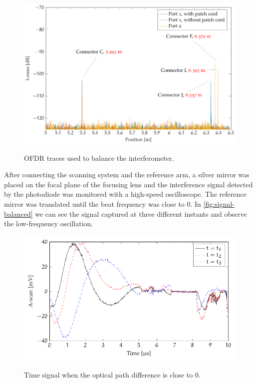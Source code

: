 \begin{figure}[hbt]
	\myfloatalign
	{	\includegraphics[width=\linewidth]{gfx/ch3/obr-balancing}}
	\caption{OFDR traces used to balance the interferometer.}\label{fig:obr-balancing}
\end{figure}

After connecting the scanning system and the reference arm, a silver mirror was placed on the focal plane of the focusing lens and the interference signal detected by the photodiode was monitored with a high-speed oscilloscope. The reference mirror was translated until the beat frequency was close to 0. In \autoref{fig:signal-balanced} we can see the signal captured at three different instants and observe the low-frequency oscillation. 


\begin{figure}[hbt]
	\myfloatalign
	{	\includegraphics[width=0.9\linewidth]{gfx/tikz/balancing/balanced}}
	\caption{Time signal when the optical path difference is close to 0.}\label{fig:signal-balanced}
\end{figure}

